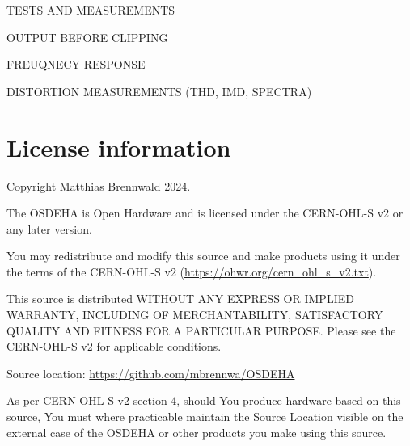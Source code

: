 TESTS AND MEASUREMENTS

OUTPUT BEFORE CLIPPING

FREUQNECY RESPONSE

DISTORTION MEASUREMENTS (THD, IMD, SPECTRA)


\section{License information} 
Copyright Matthias Brennwald 2024.                                                    

The OSDEHA is Open Hardware and is licensed under the CERN-OHL-S v2 or any later version.

You may redistribute and modify this source and make products using it under the terms of the CERN-OHL-S v2 (\url{https://ohwr.org/cern_ohl_s_v2.txt}).

This source is distributed WITHOUT ANY EXPRESS OR IMPLIED WARRANTY, INCLUDING OF MERCHANTABILITY, SATISFACTORY QUALITY AND FITNESS FOR A PARTICULAR PURPOSE. Please see the CERN-OHL-S v2 for applicable conditions.

Source location: \url{https://github.com/mbrennwa/OSDEHA}

As per CERN-OHL-S v2 section 4, should You produce hardware based on this source, You must where practicable maintain the Source Location visible on the external case of the OSDEHA or other products you make using this source.            








